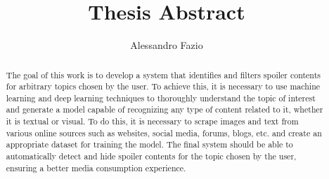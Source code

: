 \documentclass{article}
\begin{document}
\title{Thesis Abstract}
\author{Alessandro Fazio}
\maketitle

\begin{abstract}
    The goal of this work is to develop a system that
    identifies and filters spoiler contents for arbitrary
    topics chosen by the user.
    To achieve this, it is necessary to use machine learning
    and deep learning techniques to thoroughly understand the
    topic of interest and generate a model capable of
    recognizing any type of content related to it, whether it
    is textual or visual.
    To do this, it is necessary to scrape images and text from
    various online sources such as websites, social media,
    forums, blogs, etc. and create an appropriate dataset for
    training the model.
    The final system should be able to automatically detect and
    hide spoiler contents for the topic chosen by the user,
    ensuring a better media consumption experience.
\end{abstract}

\newpage

\tableofcontents
\end{document}
